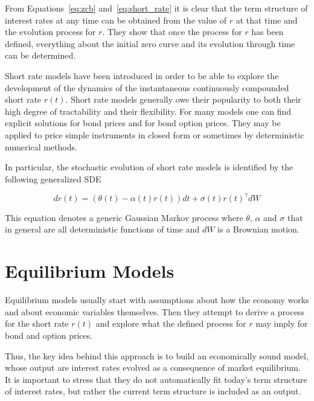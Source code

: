 
From Equations~\ref{eq:zcb} and~\ref{eq:short_rate} it is clear that the term structure of interest rates at any time can be obtained from the value of $r$ at that time and the evolution process for $r$. They show that once the process for $r$ has been defined, everything about the initial zero curve and its evolution through time can be determined.

Short rate models have been introduced in order to be able to explore the development of the dynamics of the instantaneous continuously compounded short rate $r(t)$. Short rate models generally owe their popularity to both their high degree of tractability and their flexibility. For many models one can find explicit solutions for bond prices and for bond option prices. They may be applied to price simple instruments in closed form or sometimes by deterministic numerical methods.

In particular, the stochastic evolution of short rate models is identified by the following generalized SDE

\begin{equation}
dr(t) = (\theta(t) − \alpha(t)r(t)) dt + \sigma(t)r(t)^{\gamma} dW
\label{eq:short_rate_sde}
\end{equation}

This equation denotes a generic Gaussian Markov process where $\theta$, $\alpha$ and $\sigma$ that in general are all deterministic functions of time and $dW$ is a Brownian motion.

\section{Equilibrium Models}\label{equilibrium-models}

Equilibrium models usually start with assumptions about how the economy works and about economic variables themselves. Then they attempt to derive a process for the short rate $r(t)$ and explore what the defined process for $r$ may imply for bond and option prices.

Thus, the key idea behind this approach is to build an economically sound model, whose output are interest rates evolved as a consequence of market equilibrium. It is important to stress that they do not automatically fit today’s term structure of interest rates, but rather the current term structure is included as an output. 

